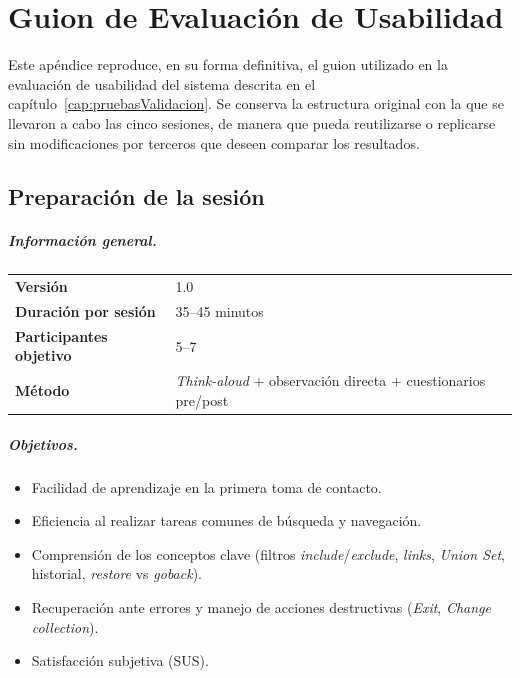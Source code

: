 \chapter{Guion de Evaluación de Usabilidad}
\label{Appendix:Guion}

Este apéndice reproduce, en su forma definitiva, el guion utilizado en la evaluación de
usabilidad del sistema descrita en el capítulo~\ref{cap:pruebasValidacion}. Se conserva la
estructura original con la que se llevaron a cabo las cinco sesiones, de manera que pueda
reutilizarse o replicarse sin modificaciones por terceros que deseen comparar los resultados.

\section{Preparación de la sesión}

\paragraph{Información general.}\leavevmode\par\nobreak\noindent
\begin{tabularx}{\linewidth}{@{}>{\bfseries}p{4.5cm} X@{}}
Versión                 & 1.0 \\
Duración por sesión     & 35--45 minutos \\
Participantes objetivo  & 5--7 \\
Método                  & \textit{Think-aloud} + observación directa + cuestionarios pre/post \\
\end{tabularx}

\paragraph{Objetivos.}
\begin{itemize}
\item Facilidad de aprendizaje en la primera toma de contacto.
\item Eficiencia al realizar tareas comunes de búsqueda y navegación.
\item Comprensión de los conceptos clave (filtros \textit{include}/\textit{exclude},
  \textit{links}, \textit{Union Set}, historial, \textit{restore} vs \textit{goback}).
\item Recuperación ante errores y manejo de acciones destructivas (\textit{Exit},
  \textit{Change collection}).
\item Satisfacción subjetiva (SUS).
\end{itemize}


